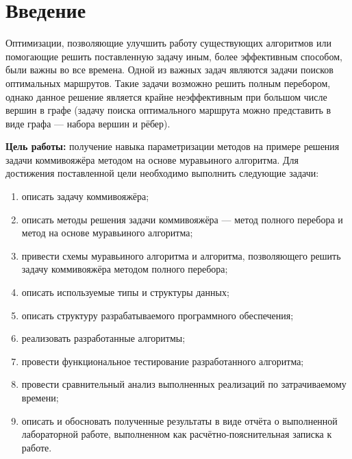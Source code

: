 \chapter*{Введение}

Оптимизации, позволяющие улучшить работу существующих алгоритмов или помогающие решить поставленную задачу иным, более эффективным способом, были важны во все времена.
Одной из важных задач являются задачи поисков оптимальных маршрутов.
Такие задачи возможно решить полным перебором, однако данное решение является крайне неэффективным при большом числе вершин в графе (задачу поиска оптимального маршрута можно представить в виде графа --- набора вершин и рёбер).

\textbf{Цель работы:} получение навыка параметризации методов на примере решения задачи коммивояжёра методом на основе муравьиного алгоритма. 
Для достижения поставленной цели необходимо выполнить следующие задачи:
\begin{enumerate}[label=\arabic*)]
	\item описать задачу коммивояжёра;
	\item описать методы решения задачи коммивояжёра --- метод полного перебора и метод на основе муравьиного алгоритма;
	\item привести схемы муравьиного алгоритма и алгоритма, позволяющего решить задачу коммивояжёра методом полного перебора;
	\item описать используемые типы и структуры данных;
	\item описать структуру разрабатываемого программного обеспечения;
	\item реализовать разработанные алгоритмы;
	\item провести функциональное тестирование разработанного алгоритма;
	\item провести сравнительный анализ выполненных реализаций по затрачиваемому времени;
	\item описать и обосновать полученные результаты в виде отчёта о выполненной лабораторной работе, выполненном как расчётно-пояснительная записка к работе.
\end{enumerate}